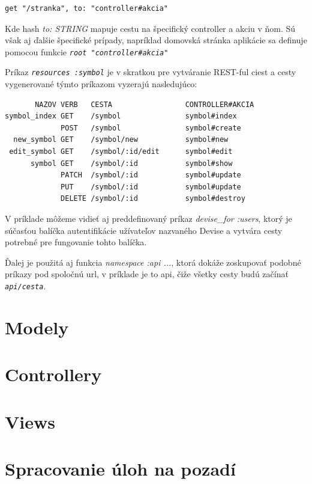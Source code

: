 \begin{verbatim}
get "/stranka", to: "controller#akcia"
\end{verbatim}

Kde hash \emph{to: STRING} mapuje cestu na špecifický controller a akciu v ňom. Sú však aj ďalšie špecifické prípady, napríklad domovská stránka aplikácie sa definuje pomocou funkcie \emph{\texttt{root "controller\#akcia"}}

Príkaz \emph{\texttt{resources :symbol}} je v skratkou pre vytváranie REST-ful ciest a cesty vygenerované týmto príkazom vyzerajú nasledujúco:

\begin{verbatim}
       NAZOV VERB   CESTA                 CONTROLLER#AKCIA
symbol_index GET    /symbol               symbol#index
             POST   /symbol               symbol#create
  new_symbol GET    /symbol/new           symbol#new
 edit_symbol GET    /symbol/:id/edit      symbol#edit
      symbol GET    /symbol/:id           symbol#show
             PATCH  /symbol/:id           symbol#update
             PUT    /symbol/:id           symbol#update
             DELETE /symbol/:id           symbol#destroy
\end{verbatim}

V príklade môžeme vidieť aj preddefinovaný príkaz \emph{devise\_for :users}, ktorý je súčasťou balíčka autentifikácie užívateľov nazvaného Devise a vytvára cesty potrebné pre fungovanie tohto balíčka.

Ďalej je použitá aj funkcia \emph{namespace :api ...}, ktorá dokáže zoskupovať podobné príkazy pod spoločnú url, v príklade je to api, čiže všetky cesty budú začínať \emph{\texttt{\/api/cesta}}.

\section{Modely}

\section{Controllery}

\section{Views}


\section{Spracovanie úloh na pozadí}


